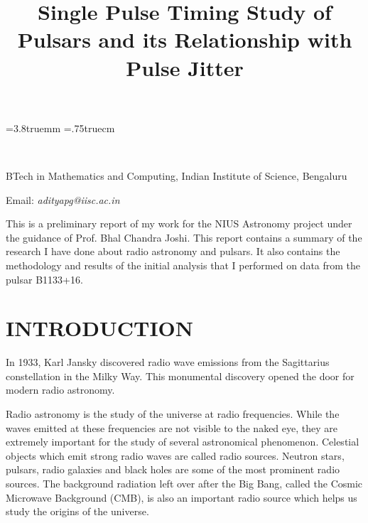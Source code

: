 \documentclass{article_saj}
\begin{document}
\pagestyle{fancy}
\fancyhead{}
\renewcommand{\headheight}{0pt}
\renewcommand{\headrulewidth}{0pt}

\parindent=0cm
\baselineskip=3.8truemm
\columnsep=.75truecm

\newenvironment{lefteqnarray}{\arraycolsep=0pt\begin{eqnarray}}
{\end{eqnarray}\protect\aftergroup\ignorespaces}
\newenvironment{lefteqnarray*}{\arraycolsep=0pt\begin{eqnarray*}}
{\end{eqnarray*}\protect\aftergroup\ignorespaces}
\newenvironment{leftsubeqnarray}{\arraycolsep=0pt\begin{subeqnarray}}
{\end{subeqnarray}\protect\aftergroup\ignorespaces}

\begin{strip}
{\ }
\vskip-5cm
{\ }

\title{Single Pulse Timing Study of Pulsars and its Relationship with Pulse Jitter}


\vskip2mm
\begin{center}
BTech in Mathematics and Computing, Indian Institute of Science, Bengaluru  
\end{center}

\vskip1mm
\begin{center}
  Email: \textit{adityapg@iisc.ac.in}
\end{center}

\vskip3mm
\noindent This is a preliminary report of my work for the NIUS Astronomy project under the guidance of Prof. Bhal Chandra Joshi. This report contains a summary of the research I have done about radio astronomy and pulsars. It also contains the methodology and results of the initial analysis that I performed on data from the pulsar B1133+16. 

\end{strip}
\tenrm

\section{INTRODUCTION}
In 1933, Karl Jansky discovered radio wave emissions from the Sagittarius constellation in the Milky Way. This monumental discovery opened the door for modern radio astronomy. 

Radio astronomy is the study of the universe at radio frequencies. While the waves emitted at these frequencies are not visible to the naked eye, they are extremely important for the study of several astronomical phenomenon. Celestial objects which emit strong radio waves are called radio sources. Neutron stars, pulsars, radio galaxies and black holes are some of the most prominent radio sources. The background radiation left over after the Big Bang, called the Cosmic Microwave Background (CMB), is also an important radio source which helps us study the origins of the universe.
\end{document}
